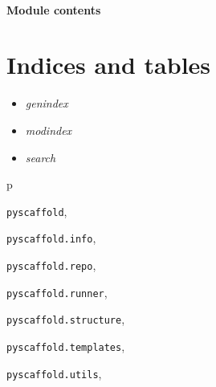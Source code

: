 \documentclass[letterpaper,10pt,english]{sphinxmanual}
\begin{document}
\subsubsection{Module contents}
\label{_rst/pyscaffold:module-contents}\label{_rst/pyscaffold:module-pyscaffold}

\chapter{Indices and tables}
\label{index:indices-and-tables}\begin{itemize}
\item {} 
\emph{genindex}

\item {} 
\emph{modindex}

\item {} 
\emph{search}

\end{itemize}


\renewcommand{\indexname}{Python Module Index}
\begin{theindex}
\def\bigletter#1{{\Large\sffamily#1}\nopagebreak\vspace{1mm}}
\bigletter{p}
\item {\texttt{pyscaffold}}, \pageref{_rst/pyscaffold:module-pyscaffold}
\item {\texttt{pyscaffold.info}}, \pageref{_rst/pyscaffold:module-pyscaffold.info}
\item {\texttt{pyscaffold.repo}}, \pageref{_rst/pyscaffold:module-pyscaffold.repo}
\item {\texttt{pyscaffold.runner}}, \pageref{_rst/pyscaffold:module-pyscaffold.runner}
\item {\texttt{pyscaffold.structure}}, \pageref{_rst/pyscaffold:module-pyscaffold.structure}
\item {\texttt{pyscaffold.templates}}, \pageref{_rst/pyscaffold:module-pyscaffold.templates}
\item {\texttt{pyscaffold.utils}}, \pageref{_rst/pyscaffold:module-pyscaffold.utils}
\end{theindex}

\renewcommand{\indexname}{Index}
\printindex
\end{document}
